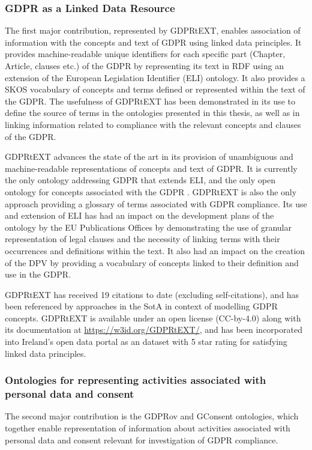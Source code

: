 \subsubsection*{GDPR as a Linked Data Resource}
The first major contribution, represented by GDPRtEXT, enables association of information with the concepts and text of GDPR using linked data principles. It provides machine-readable unique identifiers for each specific part (Chapter, Article, clauses etc.) of the GDPR by representing its text in RDF using an extension of the European Legislation Identifier (ELI) ontology. It also provides a SKOS vocabulary of concepts and terms defined or represented within the text of the GDPR. The usefulness of GDPRtEXT has been demonstrated in its use to define the source of terms in the ontologies presented in this thesis, as well as in linking information related to compliance with the relevant concepts and clauses of the GDPR.

GDPRtEXT advances the state of the art in its provision of unambiguous and machine-readable representations of concepts and text of GDPR.
It is currently the only ontology addressing GDPR that extends ELI, and the only open ontology for concepts associated with the GDPR \cite{leone_taking_2019}.
GDPRtEXT is also the only approach providing a glossary of terms associated with GDPR compliance.
Its use and extension of ELI has had an impact on the development plans of the ontology by the EU Publications Offices by demonstrating the use of granular representation of legal clauses and the necessity of linking terms with their occurrences and definitions within the text.
It also had an impact on the creation of the DPV by providing a vocabulary of concepts linked to their definition and use in the GDPR.

GDPRtEXT has received 19 citations to date (excluding self-citations), and has been referenced by approaches in the SotA in context of modelling GDPR concepts.
GDPRtEXT is available under an open license (CC-by-4.0) along with its documentation at 
\url{https://w3id.org/GDPRtEXT/}, and has been incorporated into Ireland's open data portal as an dataset with 5 star rating for satisfying linked data principles.

\subsubsection*{Ontologies for representing activities associated with personal data and consent}
The second major contribution is the GDPRov and GConsent ontologies, which together enable representation of information about activities associated with personal data and consent relevant for investigation of GDPR compliance.

